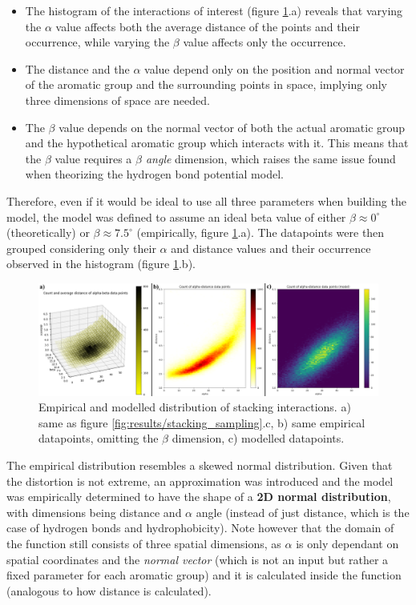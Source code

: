       \begin{itemize}
        \item The histogram of the interactions of interest (figure \ref{fig:results/stacking_modeling}.a) reveals that varying the $\alpha$ value affects both the average distance of the points and their occurrence, while varying the $\beta$ value affects only the occurrence.
        \item The distance and the $\alpha$ value depend only on the position and normal vector of the aromatic group and the surrounding points in space, implying only three dimensions of space are needed.
        \item The $\beta$ value depends on the normal vector of both the actual aromatic group and the hypothetical aromatic group which interacts with it. This means that the $\beta$ value requires a \textit{$\beta$ angle} dimension, which raises the same issue found when theorizing the hydrogen bond potential model.
      \end{itemize}

      Therefore, even if it would be ideal to use all three parameters when building the model, the model was defined to assume an ideal beta value of either $\beta \approx 0^{\circ}$ (theoretically) or $\beta \approx 7.5^{\circ}$ (empirically, figure \ref{fig:results/stacking_modeling}.a). The datapoints were then grouped considering only their $\alpha$ and distance values and their occurrence observed in the histogram (figure \ref{fig:results/stacking_modeling}.b).

      \begin{figure}[H]
        \centering
        \includegraphics[width=1\textwidth]{figures/results/stacking_modeling.png}
        \caption{\label{fig:results/stacking_modeling} Empirical and modelled distribution of stacking interactions. a) same as figure \ref{fig:results/stacking_sampling}.c, b) same empirical datapoints, omitting the $\beta$ dimension, c) modelled datapoints.}
      \end{figure}

      The empirical distribution resembles a skewed normal distribution. Given that the distortion is not extreme, an approximation was introduced and the model was empirically determined to have the shape of a \textbf{2D normal distribution}, with dimensions being distance and $\alpha$ angle (instead of just distance, which is the case of hydrogen bonds and hydrophobicity). Note however that the domain of the function still consists of three spatial dimensions, as $\alpha$ is only dependant on spatial coordinates and the \textit{normal vector} (which is not an input but rather a fixed parameter for each aromatic group) and it is calculated inside the function (analogous to how distance is calculated).

